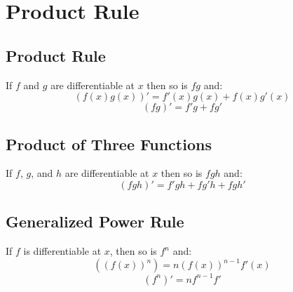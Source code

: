 \section{Product Rule}
\subsection{Product Rule}
	If $f$ and $g$ are differentiable at $x$ then so is $fg$ and:
	\[\left( f(x)g(x) \right)' = f'(x)g(x) + f(x)g'(x)\]
	\[(fg)' = f'g + fg'\]
\subsection{Product of Three Functions}
	If $f$, $g$, and $h$ are differentiable at $x$ then so is $fgh$ and:
	\[(fgh)' = f'gh + fg'h + fgh'\]
\subsection{Generalized Power Rule} 
	If $f$ is differentiable at $x$, then so is $f^n$ and:
	\[\left( \left( f(x) \right)^n \right) = n \left( f(x) \right)^{n-1} f'(x)\]
	\[\left( f^n \right)' = nf^{n-1}f'\]
